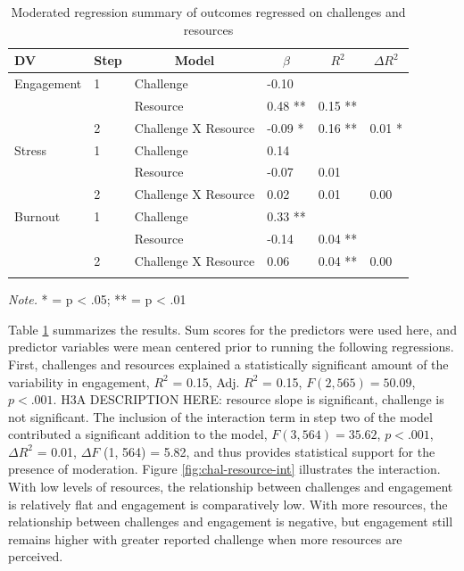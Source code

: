 \documentclass[
  man,mask]{apa7}
\begin{document}
\begin{table}[tbp]

\begin{center}
\begin{threeparttable}

\caption{\label{tab:chal-resource-table}Moderated regression summary of outcomes regressed on challenges and resources}

\begin{tabular}{llllll}
\toprule
DV & \multicolumn{1}{c}{Step} & \multicolumn{1}{c}{Model} & \multicolumn{1}{c}{$\beta$} & \multicolumn{1}{c}{$R^2$} & \multicolumn{1}{c}{$\Delta R^2$}\\
\midrule
Engagement & 1 & Challenge & -0.10 &  & \\
 &  & Resource & 0.48 ** & 0.15 ** & \\
 & 2 & Challenge X Resource & -0.09 * & 0.16 ** & 0.01 *\\
Stress & 1 & Challenge & 0.14 &  & \\
 &  & Resource & -0.07 & 0.01 & \\
 & 2 & Challenge X Resource & 0.02 & 0.01 & 0.00\\
Burnout & 1 & Challenge & 0.33 ** &  & \\
 &  & Resource & -0.14 & 0.04 ** & \\
 & 2 & Challenge X Resource & 0.06 & 0.04 ** & 0.00\\
\bottomrule
\addlinespace
\end{tabular}

\begin{tablenotes}[para]
\normalsize{\textit{Note.} * = p < .05; ** = p < .01}
\end{tablenotes}

\end{threeparttable}
\end{center}

\end{table}

Table \ref{tab:chal-resource-table} summarizes the results. Sum scores for the predictors were used here, and predictor variables were mean centered prior to running the following regressions. First, challenges and resources explained a statistically significant amount of the variability in engagement, \(R^2\) = 0.15, Adj. \(R^2\) = 0.15, \(F(2, 565) = 50.09\), \(p < .001\). H3A DESCRIPTION HERE: resource slope is significant, challenge is not significant. The inclusion of the interaction term in step two of the model contributed a significant addition to the model, \(F(3, 564) = 35.62\), \(p < .001\), \(\Delta R^2\) = 0.01, \(\Delta F\) (1, 564) = 5.82, and thus provides statistical support for the presence of moderation. Figure \ref{fig:chal-resource-int} illustrates the interaction. With low levels of resources, the relationship between challenges and engagement is relatively flat and engagement is comparatively low. With more resources, the relationship between challenges and engagement is negative, but engagement still remains higher with greater reported challenge when more resources are perceived.
\end{document}
